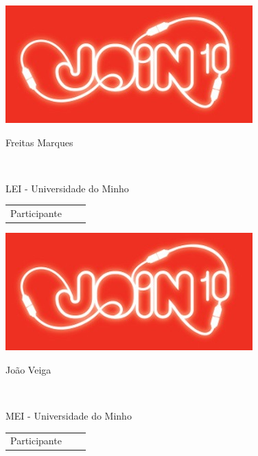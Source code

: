 \documentclass[twocolumn]{article}
\begin{document}
  
 \vspace{12mm} 
 
 \begin{minipage}{89mm} 
 \includegraphics{design/logo}\\ 
 
 \addvspace{5mm} 
 
 \begin{center} 
 \huge{Freitas Marques} 
 \scriptsize{ 
 \begin{tabular*}{0.75\textwidth}{c} 
 \hline 
 \end{tabular*}}\\ 
LEI - Universidade do Minho
 \end{center} 
 
 \begin{flushright} 
 \begin{tabular}{r l l} 
 \normalsize{Participante} & & 
 \end{tabular} 
 \end{flushright} 
 \end{minipage} 
 
  \vspace{12.5mm} 
 \begin{minipage}{89mm} 
 \includegraphics{design/logo}\\ 
 
 \addvspace{5mm} 
 
 \begin{center} 
 \huge{João Veiga} 
 \scriptsize{ 
 \begin{tabular*}{0.75\textwidth}{c} 
 \hline 
 \end{tabular*}}\\ 
MEI - Universidade do Minho
 \end{center} 
 
 \begin{flushright} 
 \begin{tabular}{r l l} 
 \normalsize{Participante} & & 
 \end{tabular} 
 \end{flushright} 
 \end{minipage} 
 
\end{document}
